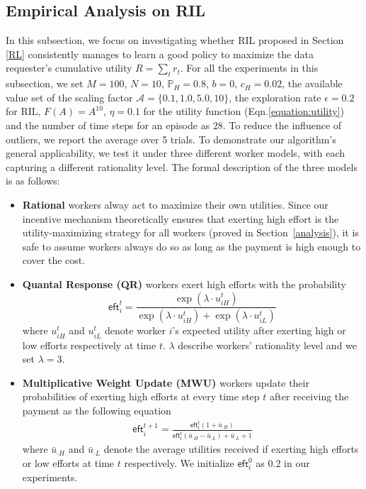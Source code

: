 \subsection{Empirical Analysis on RIL}
In this subsection, we focus on investigating whether RIL proposed in Section \ref{RL} consistently manages to learn a good policy to maximize the data requester's cumulative utility $R=\sum_t r_t$.  For all the experiments in this subsection, we set $M=100$, $N=10$, $\mathbb{P}_H=0.8$, $b=0$, $c_H=0.02$, the available value set of the scaling factor $\mathcal{A}=\{0.1,1.0,5.0,10\}$, the exploration rate $\epsilon = 0.2$ for RIL, $F(A)=A^{10}$, $\eta=0.1$ for the utility function (Eqn.\ref{equation:utility}) and the number of time steps for an episode as $28$. To reduce the influence of outliers, we report the average over 5 trials. To demonstrate our algorithm's general applicability, we test it under three different worker models, with each capturing a different rationality level.
The formal description of the three models is as follows:
\begin{itemize}[topsep=0pt, partopsep=0pt]
\item {\bf Rational} workers alway act to maximize their own utilities. Since our incentive mechanism theoretically ensures that exerting high effort %
is the utility-maximizing strategy for all workers (proved in Section~\ref{analysis}), it is safe to assume workers always do so as long as the payment is high enough to cover the cost.
\item {\bf Quantal Response (QR)} workers \citep{mckelvey1995quantal} exert high efforts with the probability 
$$
\textsf{eft}_i^t= \frac{\exp(\lambda\cdot  u_{iH}^t)}{\exp(\lambda \cdot u_{iH}^t) + \exp (\lambda \cdot u_{iL}^t)}
$$
where $u_{iH}^t$ and $u_{iL}^t$ denote worker $i$'s expected utility after exerting high or low efforts respectively at time $t$. $\lambda$ describe workers' rationality level and we set $\lambda =3$.

\item {\bf Multiplicative Weight Update (MWU)} workers \citep{chastain2014algorithms} update their probabilities of exerting high efforts at every time step $t$ after receiving the payment as the following equation
\begin{align*}
\textsf{eft}_i^{t+1} = \frac{\textsf{eft}_i^t(1+\bar{u}_{\cdot H})}{\textsf{eft}_i^t(\bar{u}_{\cdot H} - \bar{u}_{\cdot L}) + \bar{u}_{\cdot L} + 1}
\end{align*}
where $\bar{u}_{\cdot H}$ and $\bar{u}_{\cdot L}$ denote the average utilities received if exerting high efforts or low efforts at time $t$ respectively. We initialize $\textsf{eft}_i^0$ as $0.2$ in our experiments.
\end{itemize}

